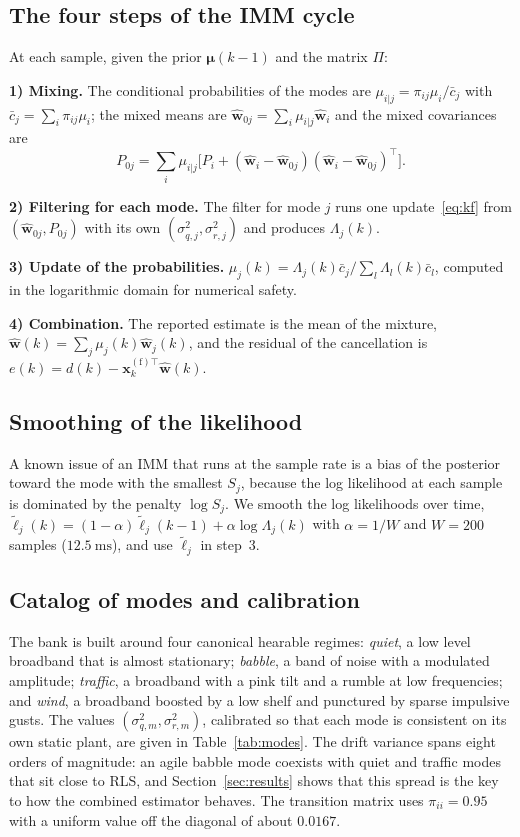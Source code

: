 \documentclass[conference]{IEEEtran}
\begin{document}
\subsection{The four steps of the IMM cycle}
At each sample, given the prior $\boldsymbol\mu(k-1)$ and the matrix $\Pi$:

\textbf{1) Mixing.} The conditional probabilities of the modes are
$\mu_{i|j}=\pi_{ij}\mu_i/\bar c_j$ with $\bar c_j=\sum_i \pi_{ij}\mu_i$; the mixed
means are $\hat{\mathbf{w}}_{0j}=\sum_i \mu_{i|j}\hat{\mathbf{w}}_i$ and the mixed
covariances are
\begin{equation}
P_{0j}=\sum_i \mu_{i|j}\big[P_i+(\hat{\mathbf{w}}_i-\hat{\mathbf{w}}_{0j})(\hat{\mathbf{w}}_i-\hat{\mathbf{w}}_{0j})^\top\big].
\end{equation}

\textbf{2) Filtering for each mode.} The filter for mode $j$ runs one
update~\eqref{eq:kf} from $(\hat{\mathbf{w}}_{0j},P_{0j})$ with its own
$(\sigma_{q,j}^2,\sigma_{r,j}^2)$ and produces $\Lambda_j(k)$.

\textbf{3) Update of the probabilities.}
$\mu_j(k)=\Lambda_j(k)\bar c_j / \sum_l \Lambda_l(k)\bar c_l$, computed in the
logarithmic domain for numerical safety.

\textbf{4) Combination.} The reported estimate is the mean of the mixture,
$\hat{\mathbf{w}}(k)=\sum_j \mu_j(k)\hat{\mathbf{w}}_j(k)$, and the residual of the
cancellation is $e(k)=d(k)-\mathbf{x}_k^{(\mathrm f)\top}\hat{\mathbf{w}}(k)$.

\subsection{Smoothing of the likelihood}
A known issue of an IMM that runs at the sample rate is a bias of the posterior
toward the mode with the smallest $S_j$, because the log likelihood at each sample
is dominated by the penalty $\log S_j$. We smooth the log likelihoods over time,
$\tilde\ell_j(k)=(1-\alpha)\tilde\ell_j(k-1)+\alpha\log\Lambda_j(k)$ with
$\alpha=1/W$ and $W=200$ samples ($\SI{12.5}{\milli\second}$), and use
$\tilde\ell_j$ in step~3.

\subsection{Catalog of modes and calibration}
The bank is built around four canonical hearable regimes: \textit{quiet}, a low
level broadband that is almost stationary; \textit{babble}, a band of noise with a
modulated amplitude; \textit{traffic}, a broadband with a pink tilt and a rumble at
low frequencies; and \textit{wind}, a broadband boosted by a low shelf and punctured
by sparse impulsive gusts. The values $(\sigma_{q,m}^2,\sigma_{r,m}^2)$, calibrated
so that each mode is consistent on its own static plant, are given in
Table~\ref{tab:modes}. The drift variance spans eight orders of magnitude: an agile
babble mode coexists with quiet and traffic modes that sit close to RLS, and
Section~\ref{sec:results} shows that this spread is the key to how the combined
estimator behaves. The transition matrix uses $\pi_{ii}=0.95$ with a uniform value
off the diagonal of about $0.0167$.
\end{document}
